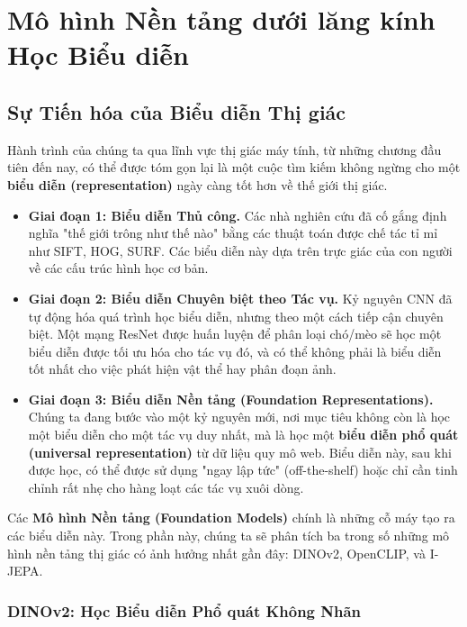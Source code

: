 \section{Mô hình Nền tảng dưới lăng kính Học Biểu diễn}
\label{sec:foundation_models_as_representations}

\subsection{Sự Tiến hóa của Biểu diễn Thị giác}
\label{subsec:evolution_of_visual_representations}
Hành trình của chúng ta qua lĩnh vực thị giác máy tính, từ những chương đầu tiên đến nay, có thể được tóm gọn lại là một cuộc tìm kiếm không ngừng cho một \textbf{biểu diễn (representation)} ngày càng tốt hơn về thế giới thị giác.
\begin{itemize}
	\item \textbf{Giai đoạn 1: Biểu diễn Thủ công.} Các nhà nghiên cứu đã cố gắng định nghĩa "thế giới trông như thế nào" bằng các thuật toán được chế tác tỉ mỉ như SIFT, HOG, SURF. Các biểu diễn này dựa trên trực giác của con người về các cấu trúc hình học cơ bản.
	\item \textbf{Giai đoạn 2: Biểu diễn Chuyên biệt theo Tác vụ.} Kỷ nguyên CNN đã tự động hóa quá trình học biểu diễn, nhưng theo một cách tiếp cận chuyên biệt. Một mạng ResNet được huấn luyện để phân loại chó/mèo sẽ học một biểu diễn được tối ưu hóa cho tác vụ đó, và có thể không phải là biểu diễn tốt nhất cho việc phát hiện vật thể hay phân đoạn ảnh.
	\item \textbf{Giai đoạn 3: Biểu diễn Nền tảng (Foundation Representations).} Chúng ta đang bước vào một kỷ nguyên mới, nơi mục tiêu không còn là học một biểu diễn cho một tác vụ duy nhất, mà là học một \textbf{biểu diễn phổ quát (universal representation)} từ dữ liệu quy mô web. Biểu diễn này, sau khi được học, có thể được sử dụng "ngay lập tức" (off-the-shelf) hoặc chỉ cần tinh chỉnh rất nhẹ cho hàng loạt các tác vụ xuôi dòng.
\end{itemize}
Các \textbf{Mô hình Nền tảng (Foundation Models)} chính là những cỗ máy tạo ra các biểu diễn này. Trong phần này, chúng ta sẽ phân tích ba trong số những mô hình nền tảng thị giác có ảnh hưởng nhất gần đây: DINOv2, OpenCLIP, và I-JEPA.

\subsubsection{DINOv2: Học Biểu diễn Phổ quát Không Nhãn}
\label{subsubsec:dinov2_math}

